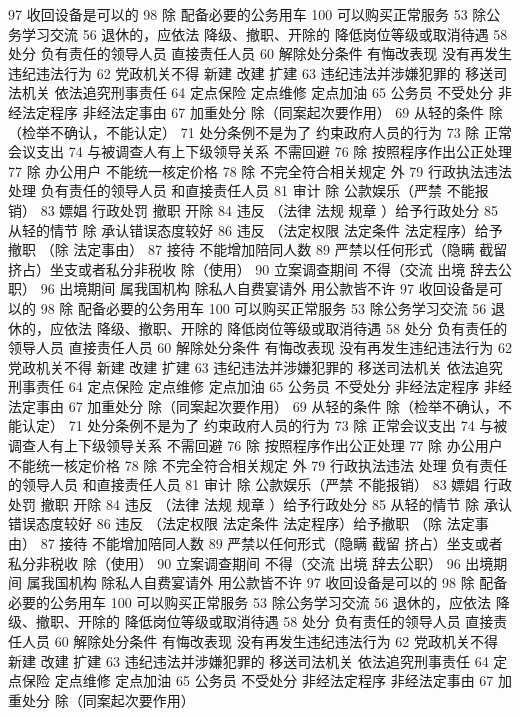 \documentclass[11pt]{ctexart}
\begin{document}
97 收回设备是可以的
98 除 配备必要的公务用车
100 可以购买正常服务
53 除公务学习交流
56 退休的，应依法
降级、撤职、开除的 降低岗位等级或取消待遇
58 处分
负有责任的领导人员
直接责任人员
60 解除处分条件
有悔改表现
没有再发生违纪违法行为
62 党政机关不得
新建 改建 扩建
63 违纪违法并涉嫌犯罪的
移送司法机关
依法追究刑事责任
64 定点保险 定点维修 定点加油
65 公务员 不受处分
非经法定程序
非经法定事由
67 加重处分
除（同案起次要作用）
69 从轻的条件
除（检举不确认，不能认定）
71 处分条例不是为了
约束政府人员的行为
73 除 正常会议支出
74 与被调查人有上下级领导关系 不需回避
76 除 按照程序作出公正处理
77 除 办公用户
不能统一核定价格
78 除 不完全符合相关规定 外
79 行政执法违法 处理
负有责任的领导人员
和直接责任人员
81 审计
除 公款娱乐（严禁 不能报销）
83 嫖娼 行政处罚
撤职 开除
84 违反 （法律 法规 规章 ）给予行政处分
85 从轻的情节
除 承认错误态度较好
86 违反 （法定权限 法定条件 法定程序）给予撤职
（除 法定事由）
87 接待 不能增加陪同人数
89 严禁以任何形式（隐瞒 截留 挤占）坐支或者私分非税收
除（使用）
90 立案调查期间 不得（交流 出境 辞去公职）
96 出境期间 属我国机构 除私人自费宴请外 用公款皆不许
97 收回设备是可以的
98 除 配备必要的公务用车
100 可以购买正常服务
53 除公务学习交流
56 退休的，应依法
降级、撤职、开除的 降低岗位等级或取消待遇
58 处分
负有责任的领导人员
直接责任人员
60 解除处分条件
有悔改表现
没有再发生违纪违法行为
62 党政机关不得
新建 改建 扩建
63 违纪违法并涉嫌犯罪的
移送司法机关
依法追究刑事责任
64 定点保险 定点维修 定点加油
65 公务员 不受处分
非经法定程序
非经法定事由
67 加重处分
除（同案起次要作用）
69 从轻的条件
除（检举不确认，不能认定）
71 处分条例不是为了
约束政府人员的行为
73 除 正常会议支出
74 与被调查人有上下级领导关系 不需回避
76 除 按照程序作出公正处理
77 除 办公用户
不能统一核定价格
78 除 不完全符合相关规定 外
79 行政执法违法 处理
负有责任的领导人员
和直接责任人员
81 审计
除 公款娱乐（严禁 不能报销）
83 嫖娼 行政处罚
撤职 开除
84 违反 （法律 法规 规章 ）给予行政处分
85 从轻的情节
除 承认错误态度较好
86 违反 （法定权限 法定条件 法定程序）给予撤职
（除 法定事由）
87 接待 不能增加陪同人数
89 严禁以任何形式（隐瞒 截留 挤占）坐支或者私分非税收
除（使用）
90 立案调查期间 不得（交流 出境 辞去公职）
96 出境期间 属我国机构 除私人自费宴请外 用公款皆不许
97 收回设备是可以的
98 除 配备必要的公务用车
100 可以购买正常服务
53 除公务学习交流
56 退休的，应依法
降级、撤职、开除的 降低岗位等级或取消待遇
58 处分
负有责任的领导人员
直接责任人员
60 解除处分条件
有悔改表现
没有再发生违纪违法行为
62 党政机关不得
新建 改建 扩建
63 违纪违法并涉嫌犯罪的
移送司法机关
依法追究刑事责任
64 定点保险 定点维修 定点加油
65 公务员 不受处分
非经法定程序
非经法定事由
67 加重处分
除（同案起次要作用）
\end{document}
